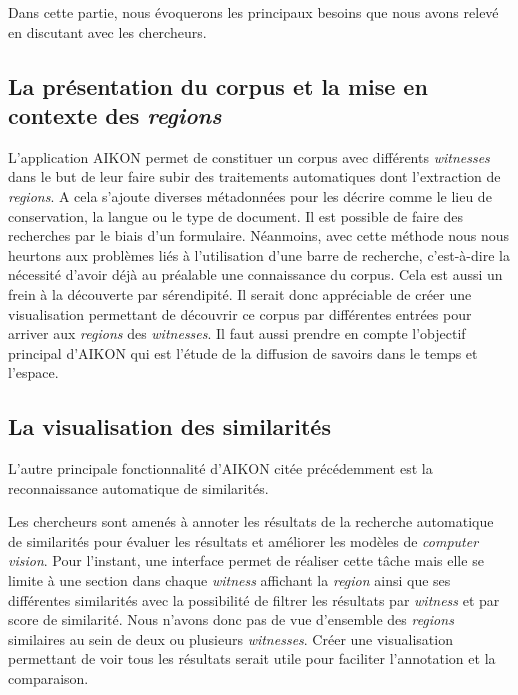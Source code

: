 Dans cette partie, nous évoquerons les principaux besoins que nous avons relevé en discutant avec les chercheurs. 

\subsection{La présentation du corpus et la mise en contexte des \textit{regions}}


L'application AIKON permet de constituer un corpus avec différents \textit{witnesses} dans le but de leur faire subir des traitements automatiques dont l'extraction de \textit{regions}. A cela s'ajoute diverses métadonnées pour les décrire comme le lieu de conservation, la langue ou le type de document. Il est possible de faire des recherches par le biais d'un formulaire. Néanmoins, avec cette méthode nous nous heurtons aux problèmes liés à l'utilisation d'une barre de recherche, c'est-à-dire la nécessité d'avoir déjà au préalable une connaissance du corpus. Cela est aussi un frein à la découverte par sérendipité. Il serait donc appréciable de créer une visualisation permettant de découvrir ce corpus par différentes entrées pour arriver aux \textit{regions} des \textit{witnesses}. Il faut aussi prendre en compte l'objectif principal d'AIKON qui est l'étude de la diffusion de savoirs dans le temps et l'espace. 


\subsection{La visualisation des similarités}

L'autre principale fonctionnalité d'AIKON citée précédemment est la reconnaissance automatique de similarités. 

Les chercheurs sont amenés à annoter les résultats de la recherche automatique de similarités pour évaluer les résultats et améliorer les modèles de \textit{computer vision}. Pour l'instant, une interface permet de réaliser cette tâche mais elle se limite à une section dans chaque \textit{witness} affichant la \textit{region} ainsi que ses différentes similarités avec la possibilité de filtrer les résultats par \textit{witness} et par score de similarité. Nous n'avons donc pas de vue d'ensemble des \textit{regions} similaires au sein de deux ou plusieurs \textit{witnesses}. Créer une visualisation permettant de voir tous les résultats serait utile pour faciliter l'annotation et la comparaison.

